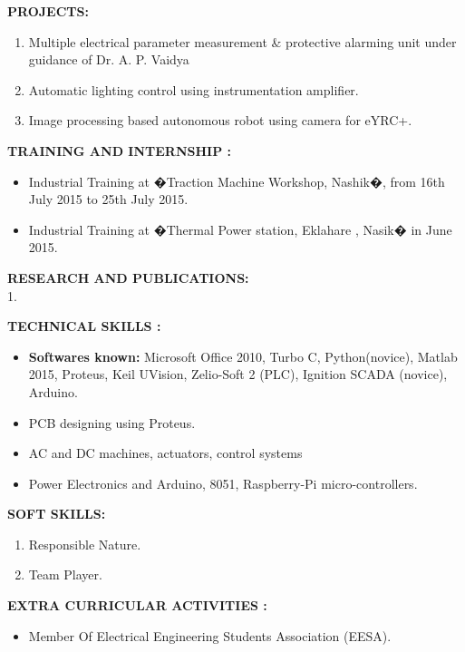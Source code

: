 \documentclass[12pt]{article}
\begin{document}
\begin{flushleft}
\begin{flushleft}
\textbf{PROJECTS:}
\end{flushleft}
\begin{enumerate}
\item Multiple electrical parameter measurement & protective alarming unit under guidance of Dr. A. P. Vaidya
\item  Automatic lighting control using instrumentation amplifier.
\item Image processing based autonomous robot using camera for eYRC+. 
\end{enumerate}
\begin{flushleft}
\textbf{TRAINING AND INTERNSHIP :}
\begin{itemize}
\item Industrial Training at �Traction Machine Workshop, Nashik�, from 16th July 2015
to 25th July 2015.
\item Industrial Training at �Thermal Power station, Eklahare , Nasik� in June 2015.
\end{itemize}
\end{flushleft}
\begin{flushleft}
\textbf{RESEARCH AND PUBLICATIONS:}\\
1.
\end{flushleft}
\begin{flushleft}
\textbf{TECHNICAL SKILLS : }
\begin{itemize}
\item \textbf{Softwares known:} Microsoft Office 2010, Turbo C, Python(novice), Matlab 2015, Proteus, Keil UVision, Zelio-Soft 2 (PLC), Ignition SCADA (novice), Arduino.
\item PCB designing using Proteus.
\item AC and DC machines, actuators, control systems
\item Power Electronics and Arduino, 8051, Raspberry-Pi micro-controllers.
\end{itemize}
\end{flushleft}
\begin{flushleft}
\textbf{SOFT SKILLS:}
\begin{enumerate}
\item Responsible Nature.
\item Team Player. 
\end{enumerate}
\begin{flushleft}
\textbf{EXTRA CURRICULAR ACTIVITIES :}
\begin{itemize}
\item Member Of Electrical Engineering Students Association (EESA).

\end{itemize}
\end{flushleft}
\end{flushleft}
\end{flushleft}
\end{document}
